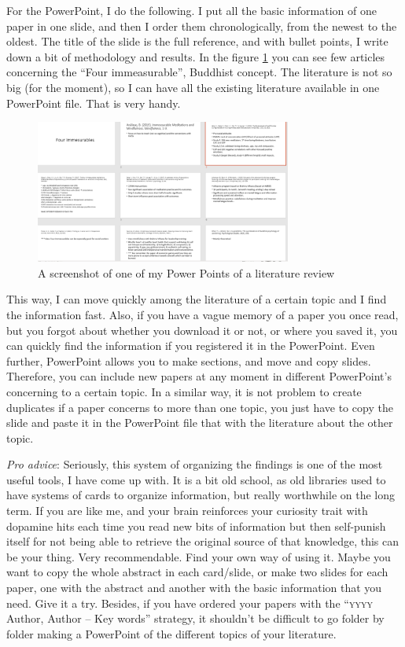 \documentclass{article}
\begin{document}
For the PowerPoint, I do the following. I put all the basic information of one paper in one slide, and then I order them chronologically, from the newest to the oldest. The title of the slide is the full reference, and with bullet points, I write down a bit of methodology and results. In the figure \ref{fig: Powerpoint} you can see few articles concerning the ``Four immeasurable'', Buddhist concept. The literature is not so big (for the moment), so I can have all the existing literature available in one PowerPoint file. That is very handy.
\begin{center}
\begin{figure}
    \centering
    \includegraphics[width = 0.75\textwidth]{images/ppt.png}
    \caption{A screenshot of one of my Power Points of a literature review }
    \label{fig: Powerpoint}
\end{figure}
\end{center}
This way, I can move quickly among the literature of a certain topic and I find the information fast. Also, if you have a vague memory of a paper you once read, but you forgot about whether you download it or not, or where you saved it, you can quickly find the information if you registered it in the PowerPoint. Even further, PowerPoint allows you to make sections, and move and copy slides. Therefore, you can include new papers at any moment in different PowerPoint’s concerning to a certain topic. In a similar way, it is not problem to create duplicates if a paper concerns to more than one topic, you just have to copy the slide and paste it in the PowerPoint file that with the literature about the other topic.

\emph{Pro advice}: Seriously, this system of organizing the findings is one of the most useful tools, I have come up with. It is a bit old school, as old libraries used to have systems of cards to organize information, but really worthwhile on the long term. If you are like me, and your brain reinforces your curiosity trait with dopamine hits each time you read new bits of information but then self-punish itself for not being able to retrieve the original source of that knowledge, this can be your thing. Very recommendable. Find your own way of using it. Maybe you want to copy the whole abstract in each card/slide, or make two slides for each paper, one with the abstract and another with the basic information that you need. Give it a try. 
Besides, if you have ordered your papers with the ``\textsc{yyyy} Author, Author – Key words'' strategy, it shouldn't be difficult to go folder by folder making a PowerPoint of the different topics of your literature.
\end{document}
